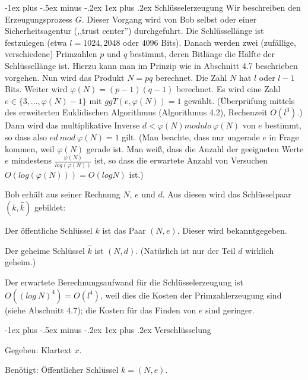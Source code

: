\documentclass[a4paper]{article}
\makeatletter
\renewcommand{\subsubsection}{\@startsection{subsubsection}{3}{0mm}%
 {-1ex plus -.5ex minus -.2ex}%
 {1ex plus .2ex}%
 {\normalfont\small\bfseries}}
\makeatother
\begin{document}
\begin{multicols}{3}
        \subsubsection{Schlüsselerzeugung}
        Wir beschreiben den Erzeugungsprozess $G$. Dieser Vorgang wird von Bob selbst oder einer Sicherheitsagentur (,,trust center'') durchgefuhrt. Die Schlüssellänge ist festzulegen (etwa $l= 1024, 2048$ oder $4096$ Bits). Danach werden zwei (zufällige, verschiedene) Primzahlen $p$ und $q$ bestimmt, deren Bitlänge die Hälfte der Schlüssellänge ist.
        Hierzu kann man im Prinzip wie in Abschnitt 4.7 beschrieben vorgehen. Nun wird das Produkt $N=pq$ berechnet. Die Zahl $N$ hat $l$ oder $l-1$ Bits. Weiter wird $\varphi(N) = (p-1)(q-1)$ berechnet. Es wird eine Zahl $e\in\{3,...,\varphi(N)-1\}$ mit $ggT(e,\varphi(N)) = 1$ gewählt. (Überprüfung mittels des erweiterten Euklidischen Algorithmus (Algorithmus 4.2), Rechenzeit $O(l^3)$.) Dann wird das multiplikative Inverse $d<\varphi(N) modulo\ \varphi(N)$ von $e$ bestimmt, so dass also $ed\ mod\ \varphi(N) = 1$ gilt. (Man beachte, dass nur ungerade $e$ in Frage kommen, weil $\varphi(N)$ gerade ist. Man weiß, dass die Anzahl der geeigneten Werte $e$ mindestens $\frac{\varphi(N)}{log(\varphi(N))}$ ist, so dass die erwartete Anzahl von Versuchen $O(log(\varphi(N)))=O(logN)$ ist.)

        Bob erhält aus seiner Rechnung $N$, $e$ und $d$. Aus diesen wird das Schlüsselpaar $(k,\hat{k})$ gebildet:
        \begin{itemize*}
            \item Der öffentliche Schlüssel $k$ ist das Paar $(N,e)$. Dieser wird bekanntgegeben.
            \item Der geheime Schlüssel $\hat{k}$ ist $(N,d)$. (Natürlich ist nur der Teil $d$ wirklich geheim.)
        \end{itemize*}

        Der erwartete Berechnungsaufwand für die Schlüsselerzeugung ist $O((log\ N)^4) =O(l^4)$, weil dies die Kosten der Primzahlerzeugung sind (siehe Abschnitt 4.7); die Kosten für das Finden von $e$ sind geringer.

        \subsubsection{Verschlüsselung}
        \begin{itemize*}
            \item Gegeben: Klartext $x$.
            \item Benötigt: Öffentlicher Schlüssel $k= (N,e)$.
        \end{itemize*}


\end{multicols}
\end{document}

